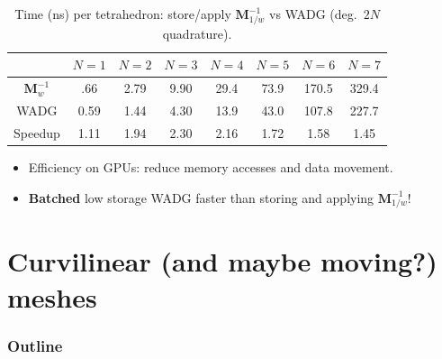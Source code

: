 \documentclass[compress]{beamer}
\begin{document}
{\begin{overlayarea}{\textwidth}{.55\textheight}
{\begin{table}
\begin{tabular}{|c||c|c|c|c|c|c|c|}
\hline
& $N = 1$ & $N = 2$ & $N = 3$ & $N = 4$ & $N = 5$ & $N = 6$ & $N = 7$\\
\hline
$\bm{M}_{w}^{-1}$ & .66 & 2.79 & 9.90 &29.4 & 73.9 & 170.5 & 329.4\\
\hline
WADG & 0.59 &   1.44   & 4.30 &   13.9 &   43.0 & 107.8 &  227.7\\
\hline
Speedup &  1.11 &    1.94 &    2.30 &    2.16 &    1.72 &   1.58 &    1.45\\
\hline
\end{tabular}
\caption*{Time (ns) per tetrahedron: store/apply $\bm{M}^{-1}_{1/w}$ vs WADG (deg.\ $2N$ quadrature).}
\end{table}
}
\end{overlayarea}

\vspace{-.5em}
\begin{itemize}
\item Efficiency on GPUs: reduce memory accesses and data movement.
\vspace{.25em}
\item \textbf{Batched} low storage WADG faster than storing and applying $\bm{M}^{-1}_{1/w}$!
\end{itemize}

}

\section{Curvilinear (and maybe moving?) meshes}

\begin{frame}[noframenumbering]
    \frametitle{Outline}
\end{frame}
\end{document}
